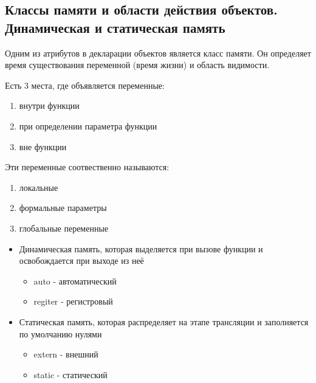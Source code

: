 \subsection{Классы памяти и области действия объектов. Динамическая и статическая память}


Одним из атрибутов в декларации объектов является класс памяти. Он определяет время существования переменной (время жизни) и область видимости.

Есть 3 места, где объявляется переменные:
\begin{enumerate}
    \item внутри функции
    \item при определении параметра функции
    \item вне функции
\end{enumerate}

Эти переменные соотвественно называются:
\begin{enumerate}
    \item локальные
    \item формальные параметры
    \item глобальные переменные
\end{enumerate}

\begin{itemize}
    \item Динамическая память, которая выделяется при вызове функции и освобождается при выходе из неё
    \begin{itemize}
        \item auto - автоматический
        \item regiter - регистровый
    \end{itemize}

    \item Статическая память, которая распределяет на этапе трансляции и заполняется по умолчанию нулями
    \begin{itemize}
        \item extern - внешний
        \item static - статический
    \end{itemize}
\end{itemize}
